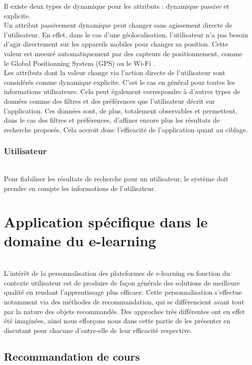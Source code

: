 \documentclass[conference]{./sty/IEEEtran}
\begin{document}
Il existe deux types de dynamique pour les attributs : dynamique passive et
explicite. \\
Un attribut passivement dynamique peut changer sans agissement
directe de l'utilisateur. En effet, dans le cas d'une géolocalisation,
l'utilisateur n'a pas besoin d'agir directement sur les appareils mobiles pour
changer sa position. Cette valeur est mesuré automatiquement par des capteurs
de positionnement, comme le Global Positionning System (GPS) ou le Wi-Fi
\cite{DBLP:journals/tlt/VerbertMOWDBD12}. \\
Les attributs dont la valeur change via l'action directe de l'utilisateur sont
considérés comme dynamique explicite. C'est le cas en général pour toutes les
informations utilisateurs. Cela peut également correspondre à d'autres types de
données comme des filtres et des préférences que l'utilisateur décrit sur
l'application. Ces données sont, de plus, totalement observables et permettent,
dans le cas des filtres et préférences, d'affiner encore plus les résultats de
recherche proposés. Cela accroit donc l'efficacité de l'application quant au
ciblage. \\

\subsubsection{Utilisateur}
~\\
Pour fiabiliser les résultats de recherche pour un utilisateur, le système doit
prendre en compte les informations de l'utilisateur. \\

\section{Application spécifique dans le domaine du e-learning}
~\\
L'intérêt de la personnalisation des plateformes de e-learning en fonction du contexte utilisateur est de produire de façon générale des solutions de meilleure qualité en rendant l'apprentissage plus efficace. Cette personnalisation s'effectue notamment via des méthodes de recommandation, qui se différencient avant tout par la nature des objets recommandés. Des approches très différentes ont en effet été imaginées, ainsi nous efforçons nous dans cette partie de les présenter en discutant pour chacune d'entre-elle de leur efficacité respective. \\

\subsection{Recommandation de cours}
\end{document}
